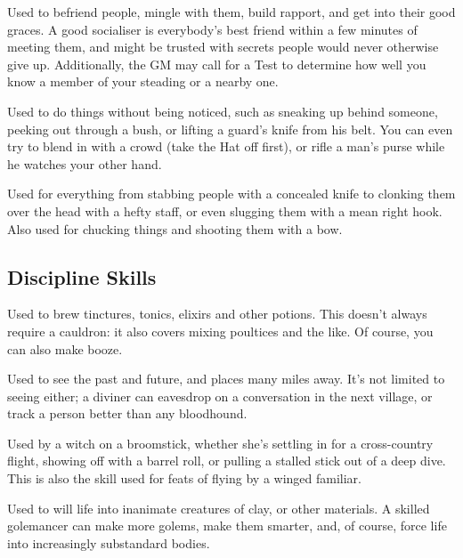 
Used to befriend people, mingle with them, build rapport, and get into their good graces.
A good socialiser is everybody's best friend within a few minutes of meeting them, and might be trusted with secrets people would never otherwise give up.
Additionally, the GM may call for a  Test to determine how well you know a member of your steading or a nearby one.


Used to do things without being noticed, such as sneaking up behind someone, peeking out through a bush, or lifting a guard's knife from his belt.
You can even try to blend in with a crowd (take the Hat off first), or rifle a man's purse while he watches your other hand.


Used for everything from stabbing people with a concealed knife to clonking them over the head with a hefty staff, or even slugging them with a mean right hook.
Also used for chucking things and shooting them with a bow.

\subsection{Discipline Skills}


Used to brew tinctures, tonics, elixirs and other potions.
This doesn't always require a cauldron: it also covers mixing poultices and the like.
Of course, you can also make booze.


Used to see the past and future, and places many miles away.
It's not limited to seeing either; a diviner can eavesdrop on a conversation in the next village, or track a person better than any bloodhound.


Used by a witch on a broomstick, whether she's settling in for a cross-country flight, showing off with a barrel roll, or pulling a stalled stick out of a deep dive.
This is also the skill used for feats of flying by a winged familiar.


Used to will life into inanimate creatures of clay, or other materials.
A skilled golemancer can make more golems, make them smarter, and, of course, force life into increasingly substandard bodies.

